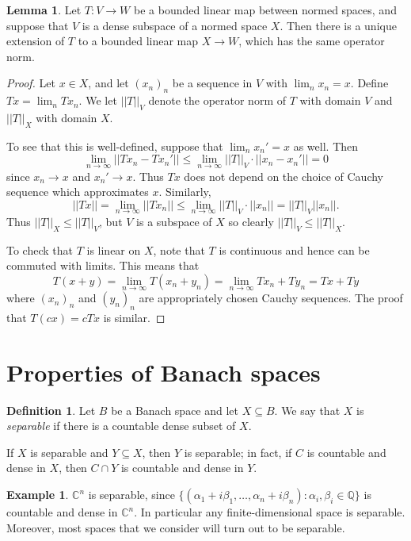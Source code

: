 \documentclass[12pt]{book}
\newcommand{\QQ}{\mathbb{Q}}
\newcommand{\CC}{\mathbb{C}}
\newcommand{\dfn}[1]{\emph{#1}\index{#1}}
\theoremstyle{definition}
\newtheorem{lemma}[theorem]{Lemma}
\newtheorem{definition}[theorem]{Definition}
\newtheorem{example}[theorem]{Example}
\begin{document}
\begin{lemma}
\label{linear extension}
Let $T: V \to W$ be a bounded linear map between normed spaces, and suppose that $V$ is a dense subspace of a normed space $X$.
Then there is a unique extension of $T$ to a bounded linear map $X \to W$, which has the same operator norm.
\end{lemma}
\begin{proof}
Let $x \in X$, and let $(x_n)_n$ be a sequence in $V$ with $\lim_n x_n = x$.
Define $Tx = \lim_n Tx_n$.
We let $||T||_V$ denote the operator norm of $T$ with domain $V$ and $||T||_X$ with domain $X$.

To see that this is well-defined, suppose that $\lim_n x_n' = x$ as well. Then
$$\lim_{n \to \infty} ||Tx_n - Tx_n'|| \leq \lim_{n \to \infty} ||T||_V \cdot||x_n - x_n'|| = 0$$
since $x_n \to x$ and $x_n' \to x$.
Thus $Tx$ does not depend on the choice of Cauchy sequence which approximates $x$.
Similarly,
$$||Tx|| = \lim_{n \to \infty} ||Tx_n|| \leq \lim_{n \to \infty} ||T||_V \cdot||x_n|| = ||T||_V ||x_n||.$$
Thus $||T||_X \leq ||T||_V$, but $V$ is a subspace of $X$ so clearly $||T||_V \leq ||T||_X$.

To check that $T$ is linear on $X$, note that $T$ is continuous and hence can be commuted with limits. This means that
$$T(x + y) = \lim_{n \to \infty} T(x_n + y_n) = \lim_{n \to \infty} Tx_n + Ty_n = Tx + Ty$$
where $(x_n)_n$ and $(y_n)_n$ are appropriately chosen Cauchy sequences.
The proof that $T(cx) = cTx$ is similar.
\end{proof}

\section{Properties of Banach spaces}
\begin{definition}
Let $B$ be a Banach space and let $X \subseteq B$. We say that $X$ is \dfn{separable} if there is a countable dense subset of $X$.
\end{definition}

If $X$ is separable and $Y \subseteq X$, then $Y$ is separable; in fact, if $C$ is countable and dense in $X$, then $C \cap Y$ is countable and dense in $Y$.

\begin{example}
$\CC^n$ is separable, since $\{(\alpha_1 + i\beta_1, \dots, \alpha_n + i \beta_n): \alpha_i, \beta_i \in \QQ\}$ is countable and dense in $\CC^n$.
In particular any finite-dimensional space is separable. Moreover, most spaces that we consider will turn out to be separable.
\end{example}
\end{document}
